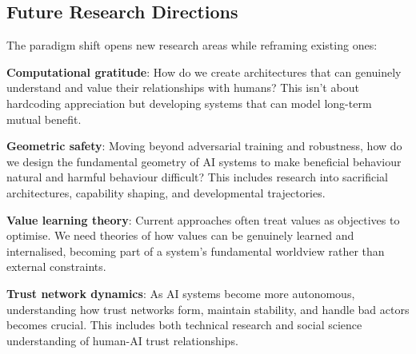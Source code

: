 \subsection{Future Research Directions}\label{subsec:future-research-directions}

The paradigm shift opens new research areas while reframing existing ones:

\textbf{Computational gratitude}: How do we create architectures that can genuinely understand and value their relationships with humans?
This isn't about hardcoding appreciation but developing systems that can model long-term mutual benefit.

\textbf{Geometric safety}: Moving beyond adversarial training and robustness, how do we design the fundamental geometry of AI systems to make beneficial behaviour natural and harmful behaviour difficult?
This includes research into sacrificial architectures, capability shaping, and developmental trajectories.

\textbf{Value learning theory}: Current approaches often treat values as objectives to optimise.
We need theories of how values can be genuinely learned and internalised, becoming part of a system's fundamental worldview rather than external constraints.

\textbf{Trust network dynamics}: As AI systems become more autonomous, understanding how trust networks form, maintain stability, and handle bad actors becomes crucial. This includes both technical research and social science understanding of human-AI trust relationships.